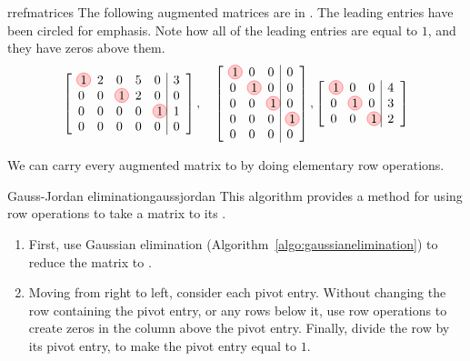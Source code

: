 \begin{example}{{\Rref}}{rrefmatrices}
The following augmented matrices are in {\rref}. The leading entries
have been circled for emphasis. Note how all of the leading entries
are equal to $1$, and they have zeros above them.
\begin{equation*}
\leftB
\begin{array}{rrrrr|r}
\circled{1} & 2 & 0 & 5 & 0 & 3 \\
0 & 0 & \circled{1} & 2 & 0 & 0 \\
0 & 0 & 0 & 0 & \circled{1} & 1 \\
0 & 0 & 0 & 0 & 0 & 0
\end{array}
\rightB,\quad\leftB
\begin{array}{rrr|r}
\circled{1} & 0 & 0 & 0 \\
0 & \circled{1} & 0 & 0 \\
0 & 0 & \circled{1} & 0 \\
0 & 0 & 0 & \circled{1} \\
0 & 0 & 0 & 0
\end{array}
\rightB , \leftB
\begin{array}{rrr|r}
\circled{1} & 0 & 0 & 4 \\
0 & \circled{1} & 0 & 3 \\
0 & 0 & \circled{1} & 2 
\end{array}
\rightB
\end{equation*}
\end{example}

We can carry every augmented matrix to {\rref} by doing elementary row
operations.

\begin{algorithm}{Gauss-Jordan elimination}{gaussjordan}
  This algorithm provides a method for using row operations to take a
  matrix to its
  {\rref} .
  \begin{enumerate}
  \item First, use Gaussian elimination
    (Algorithm~\ref{algo:gaussianelimination}) to reduce the matrix to
    {\ef}.
  \item Moving from right to left, consider each pivot entry. Without
    changing the row containing the pivot entry, or any rows below it,
    use row operations to create zeros in the column above the pivot
    entry. Finally, divide the row by its pivot entry, to make the
    pivot entry equal to $1$. 
  \end{enumerate}
\end{algorithm}

